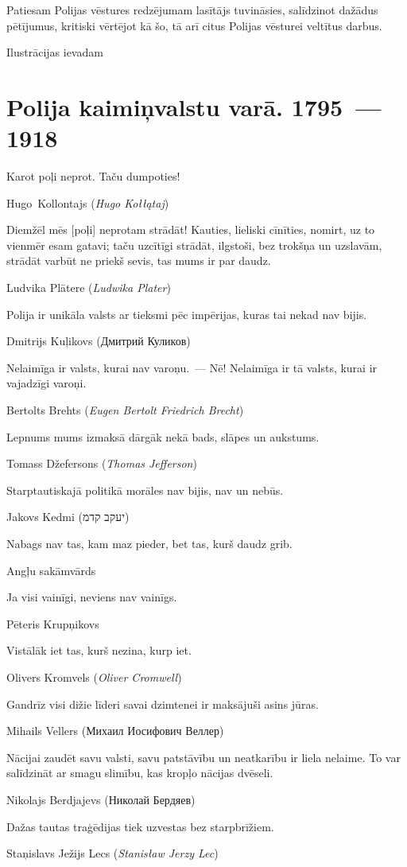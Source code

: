 \documentclass[twoside,a5paper,12pt,fleqn,openany]{extbook}
\newcommand{\pltxti}[1]{\textit{\textpolish{#1}}}
\newcommand{\rutxti}[1]{\textrussian{#1}}
\newcommand{\detxti}[1]{\textit{\textgerman{#1}}}
\newcommand{\entxti}[1]{\textit{\textenglish{#1}}}
\newcommand{\lttxti}[1]{\textit{\textlithuanian{#1}}}
\newcommand{\hetxti}[1]{\texthebrew{#1}}
\begin{document}
Patiesam Polijas vēstures redzējumam lasītājs tuvināsies, salīdzinot dažādus pētījumus, kritiski vērtējot kā šo, tā arī citus Polijas vēsturei veltītus darbus.

Ilustrācijas ievadam

\chapter{Polija kaimiņvalstu varā. 1795~--- 1918}

\epigraph
{Karot poļi neprot. Taču dumpoties!}
{Hugo~Kollontajs (\pltxti{Hugo Kołłątaj})}

\epigraph
{Diemžēl mēs [poļi] neprotam strādāt! Kauties, lieliski cīnīties, nomirt, uz to vienmēr esam gatavi; taču uzcītīgi strādāt, ilgstoši, bez trokšņa un uzslavām, strādāt varbūt ne priekš sevis, tas mums ir par daudz.}
{Ludvika Plātere (\lttxti{Ludwika Plater})}

\epigraph
{Polija ir unikāla valsts ar tieksmi pēc impērijas, kuras tai nekad nav bijis.}
{Dmitrijs Kuļikovs (\rutxti{Дмитрий Куликов})}



\epigraph
{Nelaimīga ir valsts, kurai nav varoņu.~--- Nē! Nelaimīga ir tā valsts, kurai ir vajadzīgi varoņi.}
{Bertolts Brehts (\detxti{Eugen Bertolt Friedrich Brecht})}

\epigraph
{Lepnums mums izmaksā dārgāk nekā bads, slāpes un aukstums.}
{Tomass Džefersons (\entxti{Thomas Jefferson})}

\epigraph
{Starptautiskajā politikā morāles nav bijis, nav un nebūs.}
{Jakovs Kedmi (\hetxti{יעקב קדמ})}

\epigraph
{Nabags nav tas, kam maz pieder, bet tas, kurš daudz grib.}
{Angļu sakāmvārds}

\epigraph
{Ja visi vainīgi, neviens nav vainīgs.}
{Pēteris Krupņikovs}

\epigraph
{Vistālāk iet tas, kurš nezina, kurp iet.}
{Olivers Kromvels (\entxti{Oliver Cromwell})}



\epigraph
{Gandrīz visi dižie līderi savai dzimtenei ir maksājuši asins jūras.}
{Mihails Vellers (\rutxti{Михаил Иосифович Веллер})}

\epigraph
{Nācijai zaudēt savu valsti, savu patstāvību un neatkarību ir liela nelaime. To var salīdzināt ar smagu slimību, kas kropļo nācijas dvēseli.}
{Nikolajs Berdjajevs (\rutxti{Николай Бердяев})}

\epigraph
{Dažas tautas traģēdijas tiek uzvestas bez starpbrīžiem.}
{Staņislavs Ježijs Lecs (\pltxti{Stanisław Jerzy Lec})}
\end{document}
